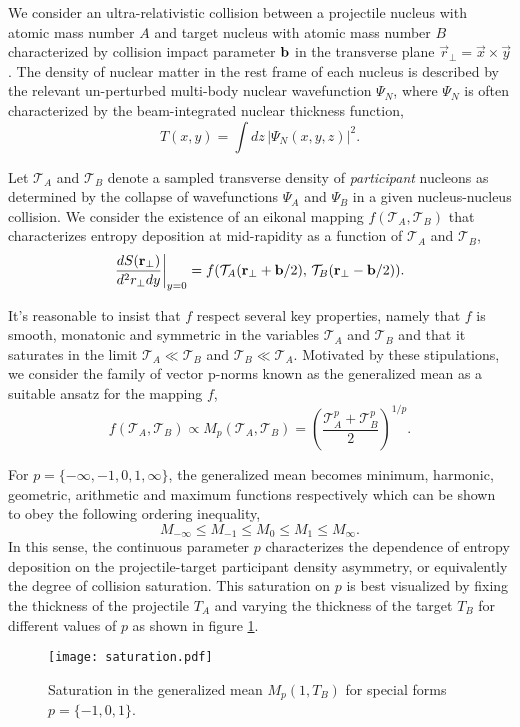 \documentclass[aps,prl,reprint,amsmath,nofootinbib]{revtex4-1}
\begin{document}
We consider an ultra-relativistic collision between a projectile nucleus with atomic mass number $A$ and target nucleus with atomic mass number $B$ characterized 
by collision impact parameter ${\bf b}$ in the transverse plane $\vec{r}_\perp = \vec{x} \times \vec{y}$. The density of nuclear matter in the rest frame of each 
nucleus is described by the relevant un-perturbed multi-body nuclear wavefunction $\Psi_N$, where $\Psi_N$ is often characterized by the beam-integrated 
nuclear thickness function,
\begin{equation}
 T(x,y) = \int dz\, \left|\Psi_N(x,y,z) \right|^2. 
\end{equation}

Let $\mathcal{T}_A$ and $\mathcal{T}_B$ denote a sampled transverse density of \emph{participant} nucleons as determined by the collapse of wavefunctions $\Psi_A$ and
$\Psi_B$ in a given nucleus-nucleus collision. We consider the existence of an eikonal mapping $f(\mathcal{T}_A,\mathcal{T}_B)$ that characterizes entropy deposition at mid-rapidity as 
a function of $\mathcal{T}_A$ and $\mathcal{T}_B$,
\begin{equation}
  \label{ansatz}
  \frac{dS({\bf r}_\perp)}{d^2r_\perp dy} \biggr \rvert_{y=0}  = f(\mathcal{T}_A({\bf r}_\perp + {\bf b}/2),\,\mathcal{T}_B({\bf r}_\perp - {\bf b}/2)).
\end{equation}

It's reasonable to insist that $f$ respect several key properties, namely that $f$ is smooth, monatonic and symmetric in the variables $\mathcal{T}_A$ and 
$\mathcal{T}_B$ and that it saturates in the limit $\mathcal{T}_A \ll \mathcal{T}_B$ and $\mathcal{T}_B \ll \mathcal{T}_A$. Motivated by these stipulations, 
we consider the family of vector p-norms known as the generalized mean as a suitable ansatz for the mapping $f$,
\begin{equation}
 \label{generalized mean ansatz}
 f(\mathcal{T}_A, \mathcal{T}_B) \propto M_p(\mathcal{T}_A,\mathcal{T}_B) = \left( \frac{\mathcal{T}_A^p + \mathcal{T}_B^p}{2} \right)^{1/p}.
\end{equation}

For $p = \{-\infty,-1,0,1,\infty\}$, the generalized mean becomes minimum, harmonic, geometric, arithmetic and maximum functions respectively which can be shown
to obey the following ordering inequality, 
\begin{equation}
 M_{-\infty} \le M_{-1} \le M_{0} \le M_{1} \le M_{\infty}.
\end{equation}
In this sense, the continuous parameter $p$ characterizes the dependence of entropy deposition on the projectile-target participant density asymmetry, or equivalently 
the degree of collision saturation. This saturation on $p$ is best visualized by fixing the thickness of the projectile $T_A$ and varying the thickness of the target 
$T_B$ for different values of $p$ as shown in figure \ref{saturation}.
\begin{figure}[b]
 \texttt{[image: saturation.pdf]}
 \caption{\label{saturation} Saturation in the generalized mean $M_p(1,T_B)$ for special forms $p=\{-1, 0, 1\}$.}
\end{figure}
\end{document}
